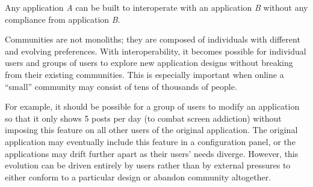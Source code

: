





\begin{requirement}
\label{requirements:adversarial-interop}
Any application \emph{A} can be built to interoperate with an application \emph{B} without any compliance from application \emph{B}.
\end{requirement}

Communities are not monoliths; they are composed of individuals
with different and evolving preferences.
With interoperability, it becomes possible for individual users and groups of users to explore new application designs
without breaking from their existing communities.
This is especially important when online a ``small''
community may consist of tens of thousands of people.

For example, it should be possible for a group of users to
modify an application so that it only shows 5 posts per day (to combat screen addiction)
without imposing this feature on all other users of the original application.
The original application may eventually include this feature in a configuration panel,
or the applications may drift further apart as their users' needs diverge. However, this
evolution can be driven entirely by users rather than by external pressures
to either conform to a particular design or abandon community altogether.

